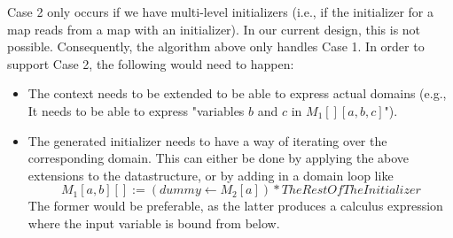 \documentclass[11pt]{amsart}
\begin{document}
Case 2 only occurs if we have multi-level initializers (i.e., if the initializer for a map reads from a map with an initializer).  In our current design, this is not possible.  Consequently, the algorithm above only handles Case 1.  In order to support Case 2, the following would need to happen:
\begin{itemize}
\item The context needs to be extended to be able to express actual domains (e.g., It needs to be able to express "variables $b$ and $c$ in $M_1[][a,b,c]$").
\item The generated initializer needs to have a way of iterating over the corresponding domain.  This can either be done by applying the above extensions to the datastructure, or by adding in a domain loop like 
$$M_1[a,b][] :=  (dummy \leftarrow M_2[a]) * TheRestOfTheInitializer$$
The former would be preferable, as the latter produces a calculus expression where the input variable is bound from below.
\end{itemize}
\end{document}
